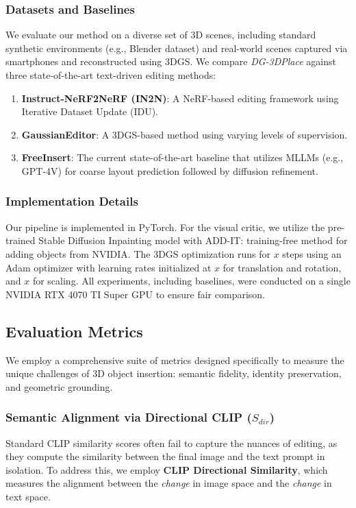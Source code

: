 \documentclass[pdflatex,sn-mathphys-num]{sn-jnl}%
\theoremstyle{thmstyleone}%
\theoremstyle{thmstyletwo}%
\theoremstyle{thmstylethree}%
\begin{document}
\subsubsection{Datasets and Baselines}
We evaluate our method on a diverse set of 3D scenes, including standard synthetic environments (e.g., Blender dataset) and real-world scenes captured via smartphones and reconstructed using 3DGS. We compare \textit{DG-3DPlace} against three state-of-the-art text-driven editing methods:
\begin{enumerate}
    \item \textbf{Instruct-NeRF2NeRF (IN2N)}: A NeRF-based editing framework using Iterative Dataset Update (IDU).
    \item \textbf{GaussianEditor}: A 3DGS-based method using varying levels of supervision.
    \item \textbf{FreeInsert}: The current state-of-the-art baseline that utilizes MLLMs (e.g., GPT-4V) for coarse layout prediction followed by diffusion refinement.
\end{enumerate}

\subsubsection{Implementation Details}
Our pipeline is implemented in PyTorch. For the visual critic, we utilize the pre-trained Stable Diffusion Inpainting model with ADD-IT: training-free method for adding objects from NVIDIA. The 3DGS optimization runs for $x$ steps using an Adam optimizer with learning rates initialized at $x$ for translation and rotation, and $x$ for scaling. All experiments, including baselines, were conducted on a single NVIDIA RTX 4070 TI Super GPU to ensure fair comparison.

\subsection{Evaluation Metrics}
We employ a comprehensive suite of metrics designed specifically to measure the unique challenges of 3D object insertion: semantic fidelity, identity preservation, and geometric grounding.

\subsubsection{Semantic Alignment via Directional CLIP ($S_{dir}$)}
Standard CLIP similarity scores often fail to capture the nuances of editing, as they compute the similarity between the final image and the text prompt in isolation. To address this, we employ \textbf{CLIP Directional Similarity}, which measures the alignment between the \textit{change} in image space and the \textit{change} in text space.
\end{document}

